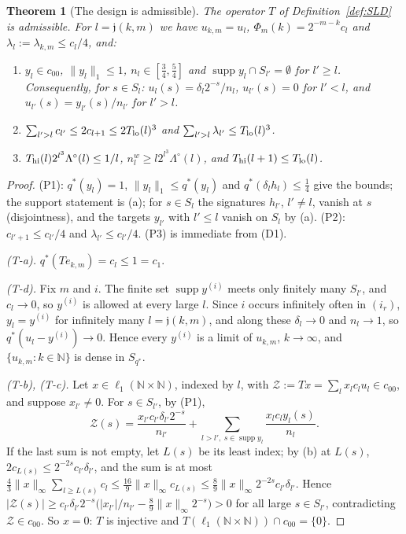 \documentclass[10pt]{amsart}
\newtheorem{theorem}{Theorem}[section]
\theoremstyle{definition}
\theoremstyle{remark}
\newcommand{\supp}{\operatorname{supp}}
\newcommand{\N}{\mathbb N}
\begin{document}
\begin{theorem}[The design is admissible]\label{thm:SLD}
The operator $T$ of Definition~\ref{def:SLD} is admissible.  For
$l=\mathfrak j(k,m)$ we have $u_{k,m}=u_l$, $\Phi_m(k)=2^{-m-k}c_l$ and
$\lambda_l:=\lambda_{k,m}\le c_l/4$, and:
\begin{enumerate}
\item[(P1)] $y_l\in c_{00}$, $\|y_l\|_1\le1$, $n_l\in[\frac34,\frac54]$ and
$\supp y_l\cap S_{l'}=\emptyset$ for $l'\ge l$.  Consequently, for
$s\in S_l$: $u_l(s)=\delta_l2^{-s}/n_l$, $u_{l'}(s)=0$ for $l'<l$, and
$u_{l'}(s)=y_{l'}(s)/n_{l'}$ for $l'>l$.
\item[(P2)] $\sum_{l'>l}c_{l'}\le2c_{l+1}\le2T_{\rm lo}(l)^3$ and
$\sum_{l'>l}\lambda_{l'}\le T_{\rm lo}(l)^3$.
\item[(P3)] $T_{\rm hi}(l)2^{l^3}\Lambda^\circ(l)\le1/l$,
$n^w_l\ge l2^{l^3}\Lambda^\circ(l)$, and $T_{\rm hi}(l+1)\le T_{\rm lo}(l)$.
\end{enumerate}
\end{theorem}

\begin{proof}
(P1): $q^*(y_l)=1$, $\|y_l\|_1\le q^*(y_l)$ and $q^*(\delta_lh_l)\le\frac14$
give the bounds; the support statement is (a); for $s\in S_l$ the
signatures $h_{l'}$, $l'\ne l$, vanish at $s$ (disjointness), and the targets
$y_{l'}$ with $l'\le l$ vanish on $S_l$ by (a).  (P2): $c_{l'+1}\le
c_{l'}/4$ and $\lambda_{l'}\le c_{l'}/4$.  (P3) is immediate from (D1).

\emph{(T-a).} $q^*(Te_{k,m})=c_l\le1=c_1$.

\emph{(T-d).}  Fix $m$ and $i$.  The finite set $\supp y^{(i)}$ meets only
finitely many $S_{l'}$, and $c_l\to0$, so $y^{(i)}$ is allowed at every
large $l$.  Since $i$ occurs infinitely often in $(i_r)$, $y_l=y^{(i)}$ for
infinitely many $l=\mathfrak j(k,m)$, and along these $\delta_l\to0$ and
$n_l\to1$, so $q^*(u_l-y^{(i)})\to0$.  Hence every $y^{(i)}$ is a limit of
$u_{k,m}$, $k\to\infty$, and $\{u_{k,m}:k\in\N\}$ is dense in $S_{q^*}$.

\emph{(T-b), (T-c).}  Let $x\in\ell_1(\N\times\N)$, indexed by $l$, with
$\mathcal Z:=T x=\sum_lx_lc_lu_l\in c_{00}$, and suppose $x_{l'}\ne0$.  For
$s\in S_{l'}$, by (P1),
\[
 \mathcal Z(s)=\frac{x_{l'}c_{l'}\delta_{l'}2^{-s}}{n_{l'}}+\sum_{l>l',\
 s\in\supp y_l}\frac{x_lc_ly_l(s)}{n_l}.
\]
If the last sum is not empty, let $L(s)$ be its least index; by (b) at
$L(s)$, $2c_{L(s)}\le2^{-2s}c_{l'}\delta_{l'}$, and the sum is at most
$\frac43\|x\|_\infty\sum_{l\ge L(s)}c_l\le\frac{16}9\|x\|_\infty c_{L(s)}\le
\frac89\|x\|_\infty2^{-2s}c_{l'}\delta_{l'}$.  Hence $|\mathcal Z(s)|\ge
c_{l'}\delta_{l'}2^{-s}\big(|x_{l'}|/n_{l'}-\frac89\|x\|_\infty2^{-s}\big)>0$
for all large $s\in S_{l'}$, contradicting $\mathcal Z\in c_{00}$.  So
$x=0$: $T$ is injective and $T(\ell_1(\N\times\N))\cap c_{00}=\{0\}$.
\end{proof}
\end{document}
